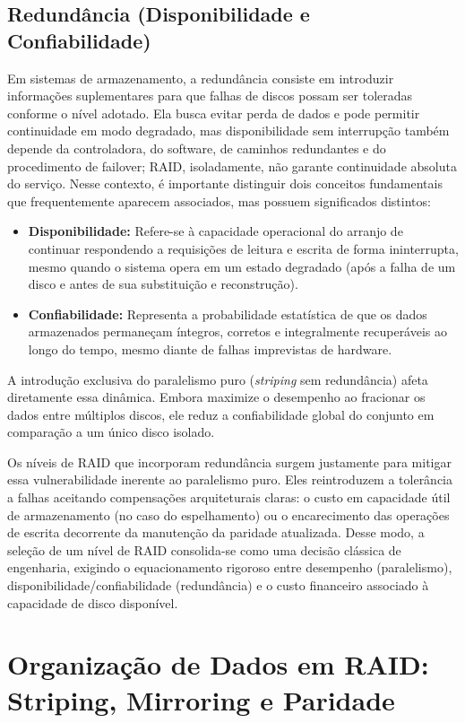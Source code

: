 \documentclass[11pt,a4paper]{article}
\begin{document}
\subsection{Redundância (Disponibilidade e Confiabilidade)}
Em sistemas de armazenamento, a redundância consiste em introduzir informações suplementares para que falhas de discos possam ser toleradas conforme o nível adotado. Ela busca evitar perda de dados e pode permitir continuidade em modo degradado, mas disponibilidade sem interrupção também depende da controladora, do software, de caminhos redundantes e do procedimento de failover; RAID, isoladamente, não garante continuidade absoluta do serviço. Nesse contexto, é importante distinguir dois conceitos fundamentais que frequentemente aparecem associados, mas possuem significados distintos:
\begin{itemize}[leftmargin=*]
    \item \textbf{Disponibilidade:} Refere-se à capacidade operacional do arranjo de continuar respondendo a requisições de leitura e escrita de forma ininterrupta, mesmo quando o sistema opera em um estado degradado (após a falha de um disco e antes de sua substituição e reconstrução).
    \item \textbf{Confiabilidade:} Representa a probabilidade estatística de que os dados armazenados permaneçam íntegros, corretos e integralmente recuperáveis ao longo do tempo, mesmo diante de falhas imprevistas de hardware.
\end{itemize}

A introdução exclusiva do paralelismo puro (\emph{striping} sem redundância) afeta diretamente essa dinâmica. Embora maximize o desempenho ao fracionar os dados entre múltiplos discos, ele reduz a confiabilidade global do conjunto em comparação a um único disco isolado. 

Os níveis de RAID que incorporam redundância surgem justamente para mitigar essa vulnerabilidade inerente ao paralelismo puro. Eles reintroduzem a tolerância a falhas aceitando compensações arquiteturais claras: o custo em capacidade útil de armazenamento (no caso do espelhamento) ou o encarecimento das operações de escrita decorrente da manutenção da paridade atualizada. Desse modo, a seleção de um nível de RAID consolida-se como uma decisão clássica de engenharia, exigindo o equacionamento rigoroso entre desempenho (paralelismo), disponibilidade/confiabilidade (redundância) e o custo financeiro associado à capacidade de disco disponível.

\section{Organização de Dados em RAID: Striping, Mirroring e Paridade}
\end{document}

